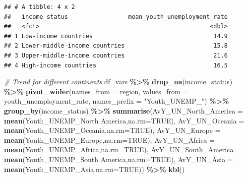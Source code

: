 \documentclass[
]{article}
\newenvironment{Shaded}{\begin{snugshade}}{\end{snugshade}}
\newcommand{\AttributeTok}[1]{\textcolor[rgb]{0.13,0.29,0.53}{#1}}
\newcommand{\CommentTok}[1]{\textcolor[rgb]{0.56,0.35,0.01}{\textit{#1}}}
\newcommand{\ConstantTok}[1]{\textcolor[rgb]{0.56,0.35,0.01}{#1}}
\newcommand{\FunctionTok}[1]{\textcolor[rgb]{0.13,0.29,0.53}{\textbf{#1}}}
\newcommand{\NormalTok}[1]{#1}
\newcommand{\SpecialCharTok}[1]{\textcolor[rgb]{0.81,0.36,0.00}{\textbf{#1}}}
\newcommand{\StringTok}[1]{\textcolor[rgb]{0.31,0.60,0.02}{#1}}
\begin{document}
\begin{verbatim}
## # A tibble: 4 x 2
##   income_status                 mean_youth_unemployment_rate
##   <fct>                                                <dbl>
## 1 Low-income countries                                  14.9
## 2 Lower-middle-income countries                         15.8
## 3 Upper-middle-income countries                         21.6
## 4 High-income countries                                 16.5
\end{verbatim}

\begin{Shaded}
\begin{Highlighting}[]
\CommentTok{\# Trend for different continents}
\NormalTok{df\_vars }\SpecialCharTok{\%\textgreater{}\%}
  \FunctionTok{drop\_na}\NormalTok{(income\_status) }\SpecialCharTok{\%\textgreater{}\%}
   \FunctionTok{pivot\_wider}\NormalTok{(}\AttributeTok{names\_from =}\NormalTok{ region, }\AttributeTok{values\_from =}\NormalTok{ youth\_unemployment\_rate, }
               \AttributeTok{names\_prefix =} \StringTok{"Youth\_UNEMP\_"}\NormalTok{) }\SpecialCharTok{\%\textgreater{}\%}
    \FunctionTok{group\_by}\NormalTok{(income\_status) }\SpecialCharTok{\%\textgreater{}\%}
      \FunctionTok{summarise}\NormalTok{(}\AttributeTok{AvY\_UN\_North\_America =} \FunctionTok{mean}\NormalTok{(}\StringTok{\textasciigrave{}}\AttributeTok{Youth\_UNEMP\_North America}\StringTok{\textasciigrave{}}\NormalTok{,}\AttributeTok{na.rm=}\ConstantTok{TRUE}\NormalTok{),}
                \AttributeTok{AvY\_UN\_Oceania       =} \FunctionTok{mean}\NormalTok{(Youth\_UNEMP\_Oceania,}\AttributeTok{na.rm=}\ConstantTok{TRUE}\NormalTok{),}
                \AttributeTok{AvY\_UN\_Europe        =} \FunctionTok{mean}\NormalTok{(Youth\_UNEMP\_Europe,}\AttributeTok{na.rm=}\ConstantTok{TRUE}\NormalTok{),}
                \AttributeTok{AvY\_UN\_Africa        =} \FunctionTok{mean}\NormalTok{(Youth\_UNEMP\_Africa,}\AttributeTok{na.rm=}\ConstantTok{TRUE}\NormalTok{),}
                \AttributeTok{AvY\_UN\_South\_America =} \FunctionTok{mean}\NormalTok{(}\StringTok{\textasciigrave{}}\AttributeTok{Youth\_UNEMP\_South America}\StringTok{\textasciigrave{}}\NormalTok{,}\AttributeTok{na.rm=}\ConstantTok{TRUE}\NormalTok{),}
                \AttributeTok{AvY\_UN\_Asia          =} \FunctionTok{mean}\NormalTok{(Youth\_UNEMP\_Asia,}\AttributeTok{na.rm=}\ConstantTok{TRUE}\NormalTok{)) }\SpecialCharTok{\%\textgreater{}\%} \FunctionTok{kbl}\NormalTok{()}
\end{Highlighting}
\end{Shaded}
\end{document}
